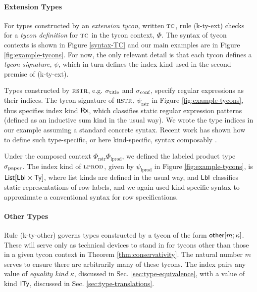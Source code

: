 \documentclass[preprint]{sigplanconf}
\begin{document}
\paragraph{Extension Types} 

For types constructed by an \emph{extension tycon}, written $\textsc{tc}$, rule (k-ty-ext) checks for a \emph{tycon definition} for $\textsc{tc}$ in the tycon context, $\Phi$. The syntax of tycon contexts is shown in Figure \ref{syntax-TC} and our main examples are in Figure \ref{fig:example-tycons}. For now, the only relevant detail is that each tycon defines a \emph{tycon signature}, $\psi$, which in turn defines the index kind used in the second premise of (k-ty-ext).

Types constructed by $\textsc{rstr}$, e.g. $\sigma_\text{title}$ and $\sigma_\text{conf}$, specify regular expressions as their indices.  The tycon signature of $\textsc{rstr}$, $\psi_\text{rstr}$ in Figure \ref{fig:example-tycons}, thus specifies index kind ${\sf Rx}$, which classifies static regular expression patterns (defined as an inductive sum kind in the usual way). We wrote the type indices in our example assuming a standard concrete syntax. Recent work has shown how to define such type-specific, or here kind-specific, syntax composably \cite{TSLs}. %

Under the composed context $\Phi_\text{rstr}\Phi_\text{lprod}$, we defined the labeled product type $\sigma_\text{paper}$. The index kind of $\textsc{lprod}$, given by $\psi_\text{lprod}$ in Figure \ref{fig:example-tycons}, is ${\sf List}[{\sf Lbl} \times {\sf Ty}]$, where list kinds are defined in the usual way, and ${\sf Lbl}$ classifies static representations of row labels, and  
we again used kind-specific syntax to approximate a conventional syntax for row specifications. 

\paragraph{Other Types}
Rule (k-ty-other) governs types constructed by a tycon of the form ${\sf other}[m; \kappa]$. These will serve only as technical devices to stand in for tycons other than those in a given tycon context in Theorem \ref{thm:conservativity}. The natural number $m$ serves to ensure there are arbitrarily many of these tycons. The index pairs any value of \emph{equality kind} $\kappa$, discussed in Sec. \ref{sec:type-equivalence}, with a value of kind ${\sf ITy}$, discussed in Sec. \ref{sec:type-translations}.%
\end{document}

